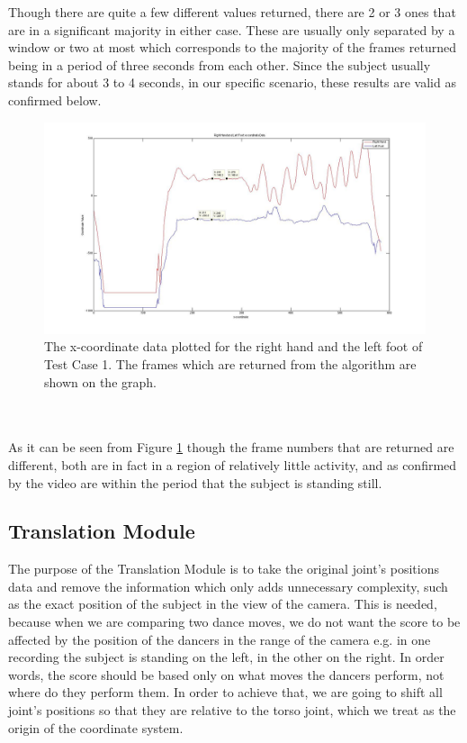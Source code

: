 \documentclass[10pt]{article}
\begin{document}
\noindent
Though there are quite a few different values returned, there are 2 or 3 ones that are in a significant majority in either case. These are usually only separated by a window or two at most which corresponds to the majority of the frames returned being in a period of three seconds from each other. Since the subject usually stands for about 3 to 4 seconds, in our specific scenario, these results are valid as confirmed below.
\begin{figure}[h]
\center
\includegraphics[scale=0.3]{Motionless_R_Hand_L_Foot_X.jpg} 
\caption{The x-coordinate data plotted for the right hand and the left foot of Test Case 1. The frames which are returned from the algorithm are shown on the graph.}
\label{motionless_rh_lf}
\end{figure}
\\\\
\noindent
As it can be seen from Figure \ref{motionless_rh_lf} though the frame numbers that are returned are different, both are in fact in a region of relatively little activity, and as confirmed by the video are within the period that the subject is standing still. 

\clearpage
\subsection{Translation Module}
\noindent
The purpose of the Translation Module is to take the original joint's positions data and remove the information which only adds unnecessary complexity, such as the exact position of the subject in the view of the camera. This is needed, because when we are comparing two dance moves, we do not want the score to be affected by the position of the dancers in the range of the camera e.g. in one recording the subject is standing on the left, in the other on the right. In order words, the score should be based only on what moves the dancers perform, not where do they perform them. In order to achieve that, we are going to shift all joint's positions so that they are relative to the torso joint, which we treat as the origin of the coordinate system.
\end{document}
